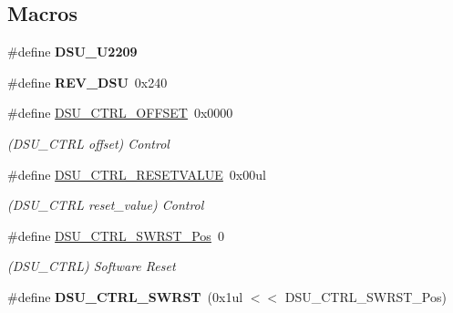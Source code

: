 \subsection*{Macros}
\begin{DoxyCompactItemize}
\item 
\hypertarget{group___s_a_m_l21___d_s_u_ga8aec87ba15ad5773fa8672a0b7ac1167}{}\#define {\bfseries D\+S\+U\+\_\+\+U2209}\label{group___s_a_m_l21___d_s_u_ga8aec87ba15ad5773fa8672a0b7ac1167}

\item 
\hypertarget{group___s_a_m_l21___d_s_u_gaf465c179d3af87802176de84057eaf96}{}\#define {\bfseries R\+E\+V\+\_\+\+D\+S\+U}~0x240\label{group___s_a_m_l21___d_s_u_gaf465c179d3af87802176de84057eaf96}

\item 
\hypertarget{group___s_a_m_l21___d_s_u_ga16d35bf197958eb309724f1d0fd8e842}{}\#define \hyperlink{group___s_a_m_l21___d_s_u_ga16d35bf197958eb309724f1d0fd8e842}{D\+S\+U\+\_\+\+C\+T\+R\+L\+\_\+\+O\+F\+F\+S\+E\+T}~0x0000\label{group___s_a_m_l21___d_s_u_ga16d35bf197958eb309724f1d0fd8e842}

\begin{DoxyCompactList}\small\item\em (D\+S\+U\+\_\+\+C\+T\+R\+L offset) Control \end{DoxyCompactList}\item 
\hypertarget{group___s_a_m_l21___d_s_u_ga2d27ac9a8ec8798ed407281b387c2fd0}{}\#define \hyperlink{group___s_a_m_l21___d_s_u_ga2d27ac9a8ec8798ed407281b387c2fd0}{D\+S\+U\+\_\+\+C\+T\+R\+L\+\_\+\+R\+E\+S\+E\+T\+V\+A\+L\+U\+E}~0x00ul\label{group___s_a_m_l21___d_s_u_ga2d27ac9a8ec8798ed407281b387c2fd0}

\begin{DoxyCompactList}\small\item\em (D\+S\+U\+\_\+\+C\+T\+R\+L reset\+\_\+value) Control \end{DoxyCompactList}\item 
\hypertarget{group___s_a_m_l21___d_s_u_ga2d08bbc3f34f53bc95415ac1c3d2ae72}{}\#define \hyperlink{group___s_a_m_l21___d_s_u_ga2d08bbc3f34f53bc95415ac1c3d2ae72}{D\+S\+U\+\_\+\+C\+T\+R\+L\+\_\+\+S\+W\+R\+S\+T\+\_\+\+Pos}~0\label{group___s_a_m_l21___d_s_u_ga2d08bbc3f34f53bc95415ac1c3d2ae72}

\begin{DoxyCompactList}\small\item\em (D\+S\+U\+\_\+\+C\+T\+R\+L) Software Reset \end{DoxyCompactList}\item 
\hypertarget{group___s_a_m_l21___d_s_u_ga271a775cfa8f562f64ab3a6f0e328a51}{}\#define {\bfseries D\+S\+U\+\_\+\+C\+T\+R\+L\+\_\+\+S\+W\+R\+S\+T}~(0x1ul $<$$<$ D\+S\+U\+\_\+\+C\+T\+R\+L\+\_\+\+S\+W\+R\+S\+T\+\_\+\+Pos)\label{group___s_a_m_l21___d_s_u_ga271a775cfa8f562f64ab3a6f0e328a51}


\end{DoxyCompactItemize}
